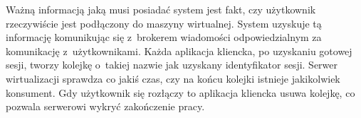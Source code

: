 \documentclass[../opis-rozwiazania.tex]{subfiles}
\begin{document}
\label{communication:user-broker}

Ważną informacją jaką musi posiadać system jest fakt, czy użytkownik rzeczywiście jest podłączony do maszyny wirtualnej.
System uzyskuje tą informację komunikując się z~brokerem wiadomości odpowiedzialnym za komunikację z~użytkownikami.
Każda aplikacja kliencka, po uzyskaniu gotowej sesji, tworzy kolejkę o~takiej nazwie jak uzyskany identyfikator sesji.
Serwer wirtualizacji sprawdza co jakiś czas, czy na końcu kolejki istnieje jakikolwiek konsument.
Gdy użytkownik się rozłączy to aplikacja kliencka usuwa kolejkę, co pozwala serwerowi wykryć zakończenie pracy.
\end{document}
